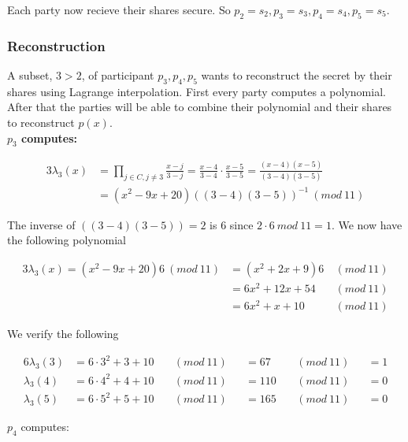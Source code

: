 \noindent
Each party now recieve their shares secure. So $p_2= s_2, p_3=s_3, p_4= s_4, p_5= s_5$.

\subsubsection{Reconstruction}
A subset, $3>2$, of participant $p_3, p_4, p_5$ wants to reconstruct the secret by their shares using Lagrange interpolation. First every party computes a polynomial. After that the parties will be able to combine their polynomial and their shares to reconstruct $p(x)$.\\

\noindent
\textbf{$p_3$ computes:}


\noindent
\begin{alignat*}{3}
\lambda_3(x)&=\prod\limits_{j\in C,j\neq3} \frac{x-j}{3-j} = \frac{x-4}{3-4} \cdot \frac{x-5}{3-5} =\frac{(x-4)(x-5)}{(3-4)(3-5)}  \\
&= (x^2-9x+20)((3-4)(3-5))^{-1} \ (mod \ 11)
\end{alignat*}

\noindent
The inverse of  $((3-4)(3-5))= 2$ is $6$ since $2 \cdot 6 \ mod \ 11 = 1$. We now have the following polynomial

\noindent
\begin{alignat*}{3}
\lambda_3(x) = (x^2-9x+20)6 \ (mod \ 11) &= (x^2 + 2x+9)6 \ &(mod \ 11) \\
&= 6x^2 + 12x + 54 \ &(mod \ 11) \\
&= 6x^2+x+ 10 \ &(mod \ 11) 
\end{alignat*}

\noindent
We verify the following


\noindent
\begin{alignat*}{6}
\lambda_3(3) &=  6 \cdot 3^2+3+ 10  \ &&(mod \ 11) &&= 67 \ &&(mod \ 11) &&= 1 \\
\lambda_3(4) &=  6 \cdot 4^2+4+ 10  \ &&(mod \ 11) &&= 110 \ &&(mod \ 11) &&= 0 \\
\lambda_3(5) &=  6 \cdot 5^2+5+ 10  \ &&(mod \ 11) &&= 165 \ &&(mod \ 11) &&= 0
\end{alignat*}

\noindent
$p_4$ computes:

